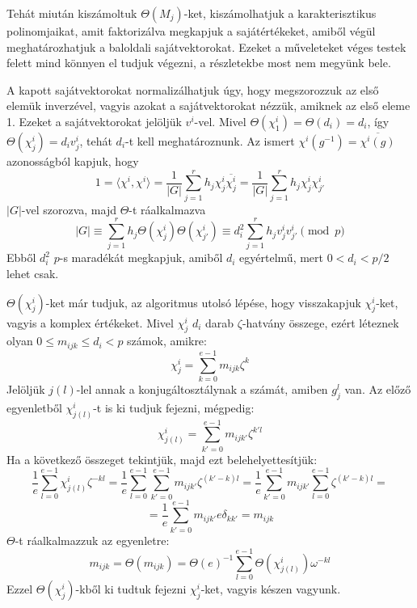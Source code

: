 Tehát miután kiszámoltuk $\Theta(M_j)$-ket, kiszámolhatjuk a karakterisztikus polinomjaikat, amit faktorizálva megkapjuk a sajátértékeket, amiből végül meghatározhatjuk a baloldali sajátvektorokat.
Ezeket a műveleteket véges testek felett mind könnyen el tudjuk végezni, a részletekbe most nem megyünk bele.

A kapott sajátvektorokat normalizálhatjuk úgy, hogy megszorozzuk az első elemük inverzével, vagyis azokat a sajátvektorokat nézzük, amiknek az első eleme 1.
Ezeket a sajátvektorokat jelöljük $v^i$-vel. Mivel $\Theta(\chi^i_1)=\Theta(d_i)=d_i$, így $\Theta(\chi^i_j)=d_i v^i_j$, tehát $d_i$-t kell meghatároznunk.
Az ismert $\chi^i(g^{-1})=\overline{\chi^i(g)}$ azonosságból kapjuk, hogy
\begin{equation}
\label{eq:bdssch3}
1 = \langle \chi^i, \chi^i \rangle = \frac{1}{|G|}\sum_{j=1}^r h_j \chi^i_j \overline{\chi^i_j} = \frac{1}{|G|}\sum_{j=1}^r h_j \chi^i_j \chi^i_{j'}
\end{equation}
$|G|$-vel szorozva, majd $\Theta$-t ráalkalmazva
\begin{equation}
\label{eq:bdssch4}
|G| \equiv \sum_{j=1}^r h_j \Theta(\chi^i_j) \Theta(\chi^i_{j'}) \equiv d_i^2 \sum_{j=1}^r h_j v^i_j v^i_{j'} \pmod{p}
\end{equation}
Ebből $d_i^2$ $p$-s maradékát megkapjuk, amiből $d_i$ egyértelmű, mert $0<d_i<p/2$ lehet csak.

$\Theta(\chi^i_j)$-ket már tudjuk, az algoritmus utolsó lépése, hogy visszakapjuk $\chi^i_j$-ket, vagyis a komplex értékeket.
Mivel $\chi^i_j$ $d_i$ darab $\zeta$-hatvány összege, ezért léteznek olyan $0\le m_{ijk}\le d_i < p$ számok, amikre:
\begin{equation}
\label{eq:bdsmijk1}
\chi^i_j = \sum_{k=0}^{e-1} m_{ijk}\zeta^k
\end{equation}
Jelöljük $j(l)$-lel annak a konjugáltosztálynak a számát, amiben $g_j^l$ van. Az előző egyenletből $\chi^i_{j(l)}$-t is ki tudjuk fejezni, mégpedig:
\begin{equation}
\label{eq:bdsmijk2}
\chi^i_{j(l)} = \sum_{k'=0}^{e-1} m_{ijk'}\zeta^{k'l}
\end{equation}
Ha a következő összeget tekintjük, majd ezt belehelyettesítjük:
\begin{equation*}
\label{eq:bdsmijk3a}
\frac{1}{e}\sum_{l=0}^{e-1} \chi^i_{j(l)} \zeta^{-kl} =
\frac{1}{e}\sum_{l=0}^{e-1} \sum_{k'=0}^{e-1} m_{ijk'}\zeta^{(k'-k)l} =
\frac{1}{e}\sum_{k'=0}^{e-1} m_{ijk'} \sum_{l=0}^{e-1} \zeta^{(k'-k)l} =
\end{equation*}
\begin{equation}
\label{eq:bdsmijk3b}
= \frac{1}{e}\sum_{k'=0}^{e-1} m_{ijk'} e \delta_{kk'} = m_{ijk}
\end{equation}
$\Theta$-t ráalkalmazzuk az egyenletre:
\begin{equation}
\label{eq:bdsmijk4}
m_{ijk} = \Theta(m_{ijk}) = \Theta(e)^{-1} \sum_{l=0}^{e-1} \Theta(\chi^i_{j(l)}) \omega^{-kl}
\end{equation}
Ezzel $\Theta(\chi^i_j)$-kből ki tudtuk fejezni $\chi^i_j$-ket, vagyis készen vagyunk.

